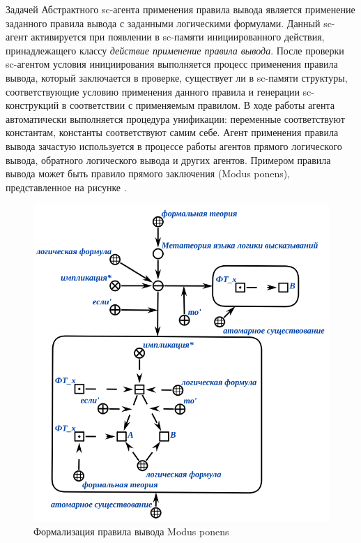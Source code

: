 Задачей Абстрактного sc-агента применения правила вывода является применение заданного правила вывода с заданными логическими формулами. Данный sc-агент активируется при появлении в sc-памяти инициированного действия, принадлежащего классу \textit{действие применение правила вывода}. После проверки sc-агентом условия инициирования выполняется процесс применения правила вывода, который заключается в  проверке, существует ли в sc-памяти структуры, соответствующие условию применения данного правила и генерации sc-конструкций в соответствии с применяемым правилом. В ходе работы агента автоматически выполняется процедура унификации: переменные соответствуют константам, константы соответствуют самим себе. Агент применения правила вывода зачастую используется в процессе работы агентов прямого логического вывода, обратного логического вывода и других агентов. Примером правила вывода может быть правило прямого заключения (Modus ponens), представленное на рисунке .

\begin{figure}[http]
	\includegraphics[scale=0.8]{author/part3/figures/Modus_ponens.png}
	\caption{Формализация правила вывода Modus ponens}
	\label{fig:modus_ponens_formalization}
\end{figure}

